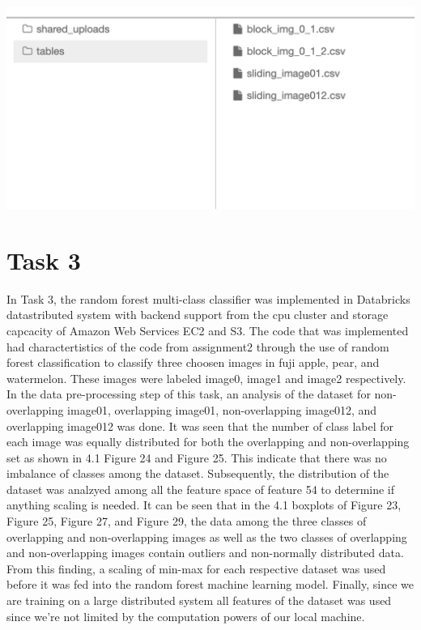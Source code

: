 \documentclass[12pt]{article}
\begin{document}
\begin{multicols*}{2}
\begin{center}
	\includegraphics[scale=0.4]{../screenshot/dataload.png}
  \end{center}


  \section{Task 3}
  \hspace*{5mm} In Task 3, the random forest multi-class classifier was implemented in Databricks datastributed system with backend support from 
  the cpu cluster and storage capcacity of Amazon Web Services EC2 and S3. The code that was implemented had charactertistics of the code from assignment2 through the use
  of random forest classification to classify three choosen images in fuji apple, pear, and watermelon. These images were labeled image0, image1 and image2 respectively. In the data pre-processing
  step of this task, an analysis of the dataset for non-overlapping image01, overlapping image01, non-overlapping image012, and overlapping image012 was done. It was seen that the number of class label
  for each image was equally distributed for both the overlapping and non-overlapping set as shown in 4.1 Figure 24 and Figure 25. This indicate that there was no imbalance of classes among the dataset.
  Subsequently, the distribution of the dataset was analzyed among all the feature space of feature 54 to determine if anything scaling is needed. It can be seen that in the 4.1 boxplots of Figure 23, Figure 25, 
  Figure 27, and Figure 29, the data among the three classes of overlapping and non-overlapping images as well as the two classes of overlapping and non-overlapping images contain outliers and non-normally distributed data. 
  From this finding, a scaling of min-max for each respective dataset was used before it was fed into the random forest machine learning model. Finally, since we are training on a large distributed system all features of the 
  dataset was used since we're not limited by the computation powers of our local machine. 


\end{multicols*}
\end{document}
